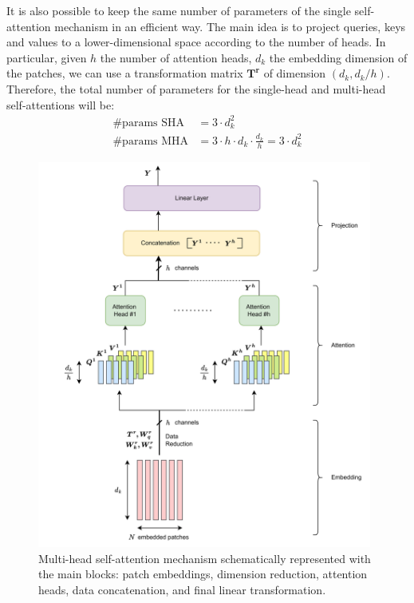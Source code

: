 It is also possible to keep the same number of parameters of the single 
self-attention mechanism in an efficient way. The main idea is to project queries, 
keys and values to a lower-dimensional space according to the number of heads.
In particular, given $h$ the number of attention heads, $d_k$ the embedding 
dimension of the patches, we can use a transformation matrix 
$\boldsymbol{T^r}$ of dimension $\left(d_k, d_k/h\right)$.
Therefore, the total number of parameters for
the single-head and multi-head self-attentions will be:
\begin{align*}
    \text{\#params SHA} &= 3 \cdot d_k^2 \\
    \text{\#params MHA} &= 3 \cdot h \cdot d_k \cdot\frac{d_k}{h} = 3 \cdot d_k^2
\end{align*}
\begin{figure}[htbp]
    \centering
    \includegraphics[width=0.98\textwidth]{images/vit/multi_head_attention_scheme.png}
    \caption[Multi-head self-attention mechanism.]
    {Multi-head self-attention mechanism schematically represented with 
    the main blocks: patch embeddings, dimension reduction, attention heads, 
    data concatenation, and final linear transformation.}
    \label{fig:multi_head_attention}
\end{figure}

